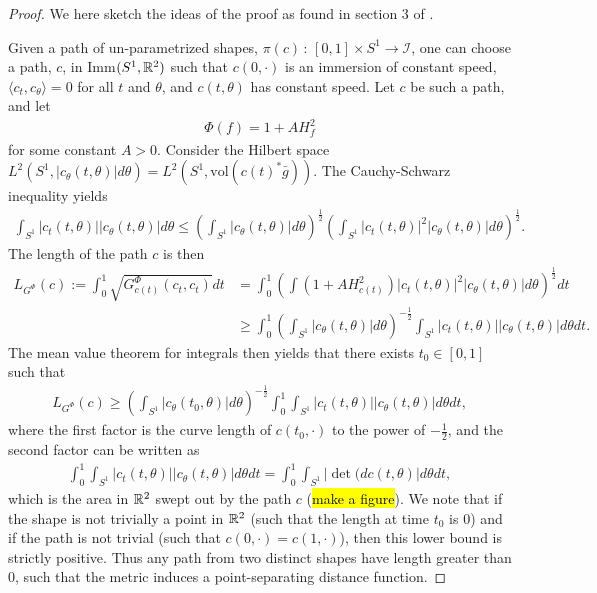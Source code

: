 \begin{proof}
We here sketch the ideas of the proof as found in section 3 of \cite{michor2003riemannian}.

Given a path of un-parametrized shapes, $\pi(c) \, : \, [0,1] \times S^1 \rightarrow \mathcal{I}$, one can choose a path, $c$, in Imm$(S^1, \mathbb{R}^2)$ such that $c(0, \cdot)$ is an immersion of constant speed, $\langle c_t, c_\theta \rangle = 0$ for all $t$ and $\theta$, and $c(t , \theta)$ has constant speed. Let $c$ be such a path, and let
\begin{align*}
\Phi(f) = 1 + A H_f ^2
\end{align*}  
for some constant $A > 0$. Consider the Hilbert space $L^2(S^1, \left| c_\theta(t, \theta) \right| d\theta) = L^2(S^1, \text{vol} (c(t)^* \bar{g}))$. The Cauchy-Schwarz inequality yields
\begin{align*}
\int_{S^1} \left| c_t(t, \theta) \right| \left| c_\theta(t, \theta) \right| d \theta \leq \left(\int_{S^1} \left| c_\theta(t, \theta) \right| d \theta \right) ^{\frac{1}{2}} \left( \int_{S^1} \left| c_t(t, \theta) \right|^2 \left| c_\theta(t, \theta) \right| d \theta   \right) ^{\frac{1}{2}}.
\end{align*} 
The length of the path $c$ is then
\begin{align*}
L_{G^{\Phi}}(c) := \int_0^1  \sqrt{G^{\Phi}_{c(t)}(c_t, c_t)} dt &= \int_0^1 \left( \int (1 + AH_{c(t)}^2 ) \left| c_t(t, \theta) \right|^2 \left| c_\theta(t, \theta) \right| d\theta     \right) ^{\frac{1}{2}} dt \\
& \geq \int_0^1 \left(\int_{S^1} \left| c_\theta(t, \theta) \right| d \theta \right) ^{-\frac{1}{2}} \int_{S^1} \left| c_t(t, \theta) \right| \left| c_\theta(t, \theta) \right| d \theta dt.
\end{align*}
The mean value theorem for integrals then yields that there exists $t_0 \in [0, 1]$ such that
\begin{align*}
L_{G^{\Phi}}(c)\geq  \left(\int_{S^1} \left| c_\theta(t_0, \theta) \right| d \theta \right) ^{-\frac{1}{2}} \int_0^1 \int_{S^1} \left| c_t(t, \theta) \right| \left| c_\theta(t, \theta) \right| d \theta dt,
\end{align*}
where the first factor is the curve length of $c(t_0, \cdot)$ to the power of $-\frac{1}{2}$, and the second factor can be written as
\begin{align*}
\int_0^1 \int_{S^1} \left| c_t(t, \theta) \right| \left| c_\theta(t, \theta) \right| d \theta dt = \int_0^1 \int_{S^1} \left| \det (d c(t, \theta) \right| d \theta dt,
\end{align*}
which is the area in $\mathbb{R}^2$ swept out by the path $c$ (\hl{make a figure}). We note that if the shape is not trivially a point in $\mathbb{R}^2$ (such that the length at time $t_0$ is $0$) and if the path is not trivial (such that $c(0, \cdot) = c(1, \cdot)$), then this lower bound is strictly positive. Thus any path from two distinct shapes have length greater than $0$, such that the metric induces a point-separating distance function. 
\end{proof}

